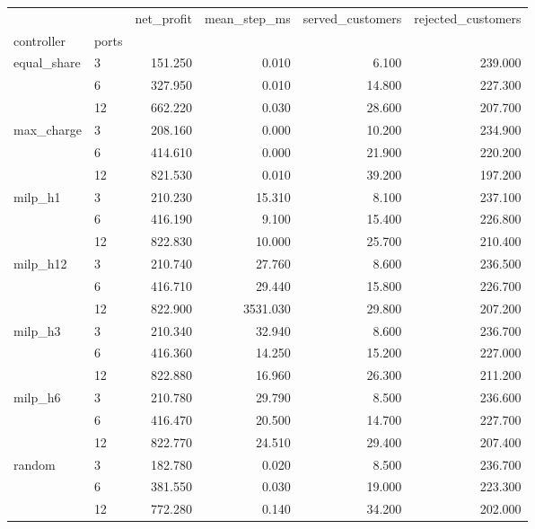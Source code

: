\begin{tabular}{llrrrr}
\toprule
 &  & net_profit & mean_step_ms & served_customers & rejected_customers \\
controller & ports &  &  &  &  \\
\midrule
\multirow[t]{3}{*}{equal_share} & 3 & 151.250 & 0.010 & 6.100 & 239.000 \\
 & 6 & 327.950 & 0.010 & 14.800 & 227.300 \\
 & 12 & 662.220 & 0.030 & 28.600 & 207.700 \\
\cline{1-6}
\multirow[t]{3}{*}{max_charge} & 3 & 208.160 & 0.000 & 10.200 & 234.900 \\
 & 6 & 414.610 & 0.000 & 21.900 & 220.200 \\
 & 12 & 821.530 & 0.010 & 39.200 & 197.200 \\
\cline{1-6}
\multirow[t]{3}{*}{milp_h1} & 3 & 210.230 & 15.310 & 8.100 & 237.100 \\
 & 6 & 416.190 & 9.100 & 15.400 & 226.800 \\
 & 12 & 822.830 & 10.000 & 25.700 & 210.400 \\
\cline{1-6}
\multirow[t]{3}{*}{milp_h12} & 3 & 210.740 & 27.760 & 8.600 & 236.500 \\
 & 6 & 416.710 & 29.440 & 15.800 & 226.700 \\
 & 12 & 822.900 & 3531.030 & 29.800 & 207.200 \\
\cline{1-6}
\multirow[t]{3}{*}{milp_h3} & 3 & 210.340 & 32.940 & 8.600 & 236.700 \\
 & 6 & 416.360 & 14.250 & 15.200 & 227.000 \\
 & 12 & 822.880 & 16.960 & 26.300 & 211.200 \\
\cline{1-6}
\multirow[t]{3}{*}{milp_h6} & 3 & 210.780 & 29.790 & 8.500 & 236.600 \\
 & 6 & 416.470 & 20.500 & 14.700 & 227.700 \\
 & 12 & 822.770 & 24.510 & 29.400 & 207.400 \\
\cline{1-6}
\multirow[t]{3}{*}{random} & 3 & 182.780 & 0.020 & 8.500 & 236.700 \\
 & 6 & 381.550 & 0.030 & 19.000 & 223.300 \\
 & 12 & 772.280 & 0.140 & 34.200 & 202.000 \\
\cline{1-6}
\bottomrule
\end{tabular}
